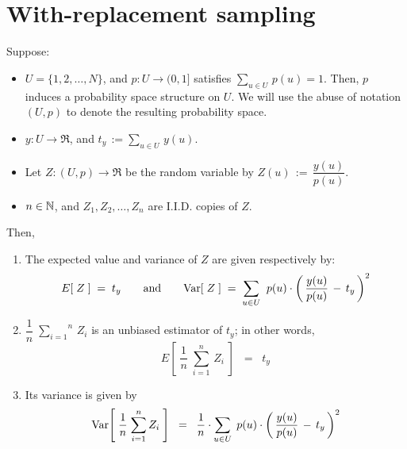 

\section{With-replacement sampling}
\setcounter{theorem}{0}
\setcounter{equation}{0}


\renewcommand{\theenumi}{\roman{enumi}}
\renewcommand{\labelenumi}{\textnormal{(\theenumi)}$\;\;$}


\begin{theorem}
\mbox{}\vskip 0.2cm
\noindent
Suppose:
\begin{itemize}
\item
	$U = \{1,2,\ldots,N\}$,
	\;and\;
	$p : U \longrightarrow (0,1]$ \;satisfies\; $\underset{u \in U}{\sum}\,p(u) = 1$.
	\vskip 0.1cm
	Then, $p$ induces a probability space structure on $U$.
	We will use the abuse of notation $(U,p)$ to denote the resulting probability space.
\item
	$y : U \longrightarrow \Re$, \;and\; $t_{y} \,:= \underset{u \in U}{\sum}\,y(u)$.
\item
	Let $Z : (U,p) \longrightarrow \Re$ be the random variable by\;
	$Z(u) \,:=\, \dfrac{y(u)}{p(u)}$.
\item
	$n \in \mathbb{N}$, \;and\; $Z_{1}, Z_{2}, \ldots, Z_{n}$ are I.I.D. copies of $Z$.
\end{itemize}
Then,
\begin{enumerate}
\item
	The expected value and variance of $Z$ are given respectively by:
	\begin{equation*}
	E\!\left[\;Z\;\right] \;=\; t_{y}
	\quad\quad\textnormal{and}\quad\quad
	\textnormal{Var}\!\left[\;Z\;\right] \;=\; \underset{u \in U}{\sum}\;\; p(u)\cdot\left(\,\dfrac{y(u)}{p(u)}\,-\,t_{y}\,\right)^{2}
	\end{equation*}
\item
	$\dfrac{1}{n}\;\overset{n}{\underset{i=1}{\sum}}\,Z_{i}$
	is an unbiased estimator of $t_{y}$;
	in other words,
	\begin{equation*}
	E\!\left[\;\dfrac{1}{n}\;\overset{n}{\underset{i=1}{\sum}}\,Z_{i}\;\right]
	\;\; = \;\;
		t_{y}
	\end{equation*}
\item
	Its variance is given by
	\begin{equation*}
	\textnormal{Var}\!\left[\;\dfrac{1}{n}\;\overset{n}{\underset{i=1}{\sum}}\,Z_{i}\;\right]
	\;\; = \;\;
		\dfrac{1}{n} \cdot \underset{u \in U}{\sum}\;\,p(u)\cdot\left(\,\dfrac{y(u)}{p(u)}\,-\,t_{y}\,\right)^{2}
	\end{equation*}
\end{enumerate}
\end{theorem}
